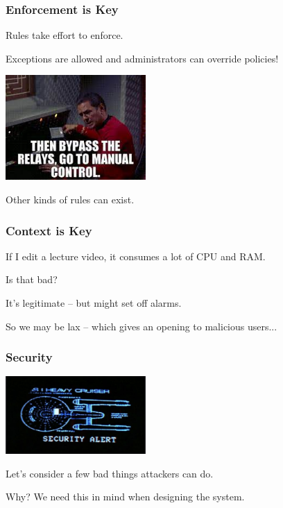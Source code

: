 \begin{frame}
\frametitle{Enforcement is Key}

Rules take effort to enforce.

Exceptions are allowed and administrators can override policies!

\begin{center}
	\includegraphics[width=0.4\textwidth]{images/override.jpg}
\end{center}

Other kinds of rules can exist.

\end{frame}


\begin{frame}
\frametitle{Context is Key}

If I edit a lecture video, it consumes a lot of CPU and RAM.

Is that bad?

It's legitimate -- but might set off alarms.

So we may be lax -- which gives an opening to malicious users...


\end{frame}



\begin{frame}
\frametitle{Security}

\begin{center}
	\includegraphics[width=0.4\textwidth]{images/security-alert.png}
\end{center}

Let's consider a few bad things attackers can do.

Why? We need this in mind when designing the system.


\end{frame}


